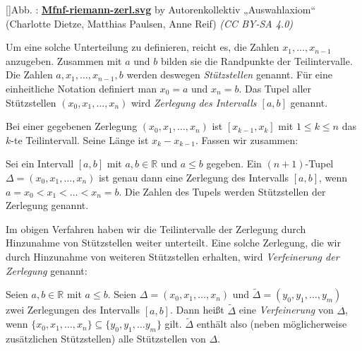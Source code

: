 \documentclass[fontsize=9pt,
               parskip=half-,
               DIV=14,
               listof=chapterentry,
               tocflat]{scrbook}
\newcounter{imagelabel}
\begin{document}
[]{Abb. : \protect\href{https://commons.wikimedia.org/wiki/File:Mfnf-riemann-zerl.svg}{\textbf{Mfnf\allowbreak-riemann\allowbreak-zerl.svg}} by Autorenkollektiv „Auswahlaxiom“ (Charlotte Dietze, Matthias Paulsen, Anne Reif) \textit{(CC BY-SA 4.0)}}\begin{center}
\end{center}

Um eine solche Unterteilung zu definieren, reicht es, die Zahlen $x_{1},\ldots ,x_{n-1}$ anzugeben. Zusammen mit $a$ und $b$ bilden sie die Randpunkte der Teilintervalle. Die Zahlen $a,x_{1},\ldots ,x_{n-1},b$ werden deswegen \emph{Stützstellen} genannt. Für eine einheitliche Notation definiert man $x_{0}=a$ und $x_{n}=b$. Das Tupel aller Stützstellen $(x_{0},x_{1},\ldots ,x_{n})$ wird \emph{Zerlegung des Intervalls $[a,b]$} genannt.

Bei einer gegebenen Zerlegung $(x_{0},x_{1},\ldots ,x_{n})$ ist $[x_{k-1},x_{k}]$ mit $1\leq k\leq n$ das $k$-te Teilintervall. Seine Länge ist $x_{k}-x_{k-1}$. Fassen wir zusammen:

\begin{definition*}[Zerlegung]
Sei ein Intervall $[a,b]$ mit $a,b\in \mathbb {R} $ und $a\leq b$ gegeben. Ein $(n+1)$-Tupel $\Delta =(x_{0},x_{1},\ldots ,x_{n})$ ist genau dann eine Zerlegung des Intervalls $[a,b]$, wenn $a=x_{0}<x_{1}<\ldots <x_{n}=b$. Die Zahlen des Tupels werden Stützstellen der Zerlegung genannt.

\end{definition*}

Im obigen Verfahren haben wir die Teilintervalle der Zerlegung durch Hinzunahme von Stützstellen weiter unterteilt. Eine solche Zerlegung, die wir durch Hinzunahme von weiteren Stützstellen erhalten, wird \emph{Verfeinerung der Zerlegung} genannt:

\begin{definition*}
Seien $a,b\in \mathbb {R} $ mit $a\leq b$. Seien $\Delta =(x_{0},x_{1},\ldots ,x_{n})$ und ${\tilde {\Delta }}=(y_{0},y_{1},\ldots ,y_{m})$ zwei Zerlegungen des Intervalls $[a,b]$. Dann heißt ${\tilde {\Delta }}$ eine \emph{Verfeinerung} von $\Delta $, wenn $\{x_{0},x_{1},\ldots ,x_{n}\}\subseteq \{y_{0},y_{1},\ldots y_{m}\}$ gilt. ${\tilde {\Delta }}$ enthält also (neben möglicherweise zusätzlichen Stützstellen) alle Stützstellen von $\Delta $.

\end{definition*}
\end{document}
